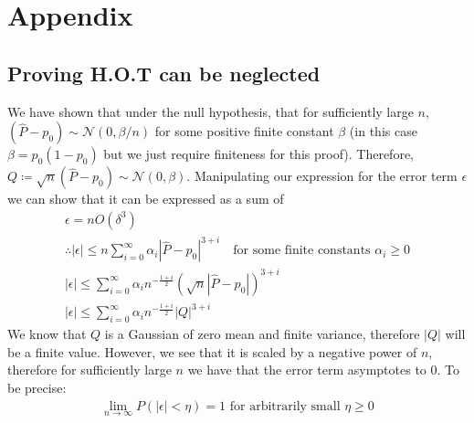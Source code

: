 \documentclass[]{article}
\newcommand{\Gaussian}{\mathcal{N}}
\begin{document}
\section{Appendix}

\subsection{Proving H.O.T can be neglected}
We have shown that under the null hypothesis, that for sufficiently large $n$, $(\hat{P}-p_0) \sim \Gaussian(0, \beta/n)$ for some positive finite constant $\beta$ (in this case $\beta = p_0(1-p_0)$ but we just require finiteness for this proof). Therefore, $Q \coloneqq \sqrt{n} (\hat{P} - p_0) \sim \Gaussian(0,\beta)$. Manipulating our expression for the error term $\epsilon$ we can show that it can be expressed as a sum of 
%
\begin{equation}
\begin{gathered}
\epsilon = n O(\delta^3) \\
\therefore |\epsilon| \leq n \sum_{i=0}^{\infty} \alpha_i|\hat{P} - p_0|^{3+i} 
\quad \text{for some finite constants } \alpha_i \geq 0 \\
|\epsilon| \leq \sum_{i=0}^{\infty} \alpha_i n^{-\frac{1+i}{2}}( \sqrt{n}|\hat{P} - p_0|)^{3+i} \\
|\epsilon| \leq \sum_{i=0}^{\infty} \alpha_i n^{-\frac{1+i}{2}}|Q|^{3+i}
\end{gathered}
\end{equation}
%
We know that $Q$ is a Gaussian of zero mean and finite variance, therefore $|Q|$ will be a finite value. However, we see that it is scaled by a negative power of $n$, therefore for sufficiently large $n$ we have that the error term asymptotes to 0. To be precise:
%
\begin{equation}
\begin{gathered}
\lim_{n \rightarrow \infty} P(|\epsilon| < \eta) = 1 \text{ for arbitrarily small } \eta \ge 0
\end{gathered}
\end{equation}
\end{document}

